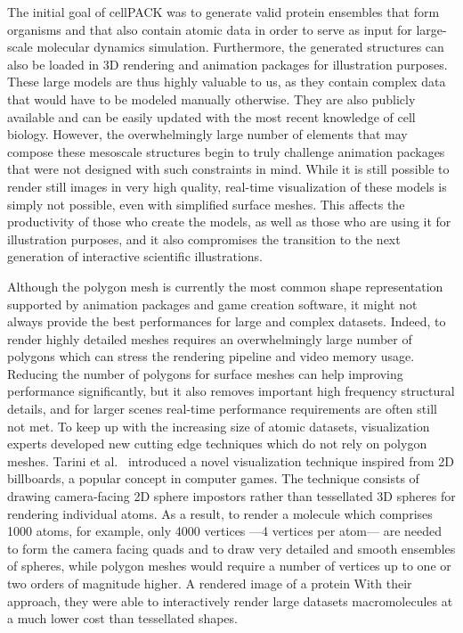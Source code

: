 The initial goal of cellPACK was to generate valid protein ensembles that form organisms and that also contain atomic data in order to serve as input for large-scale molecular dynamics simulation.
Furthermore, the generated structures can also be loaded in 3D rendering and animation packages for illustration purposes.
These large models are thus highly valuable to us, as they contain complex data that would have to be modeled manually otherwise.
They are also publicly available and can be easily updated with the most recent knowledge of cell biology.
However, the overwhelmingly large number of elements that may compose these mesoscale structures begin to truly challenge animation packages that were not designed with such constraints in mind.
While it is still possible to render still images in very high quality, real-time visualization of these models is simply not possible, even with simplified surface meshes. 
This affects the productivity of those who create the models, as well as those who are using it for illustration purposes, and it also compromises the transition to the next generation of interactive scientific illustrations.

Although the polygon mesh is currently the most common shape representation supported by animation packages and game creation software, it might not always provide the best performances for large and complex datasets.
Indeed, to render highly detailed meshes requires an overwhelmingly large number of polygons which can stress the rendering pipeline and video memory usage.
Reducing the number of polygons for surface meshes can help improving performance significantly, but it also removes important high frequency structural details, and for larger scenes real-time performance requirements are often still not met.
To keep up with the increasing size of atomic datasets, visualization experts developed new cutting edge techniques which do not rely on polygon meshes.
Tarini et al.~\cite{tarini2006ambient} introduced a novel visualization technique inspired from 2D billboards, a popular concept in computer games.
The technique consists of drawing camera-facing 2D sphere impostors rather than tessellated 3D spheres for rendering individual atoms.
As a result, to render a molecule which comprises 1000 atoms, for example, only 4000 vertices ---4 vertices per atom--- are needed to form the camera facing quads and to draw very detailed and smooth ensembles of spheres, while polygon meshes would require a number of vertices up to one or two orders of magnitude higher.
A rendered image of a protein 
With their approach, they were able to interactively render large datasets macromolecules at a much lower cost than tessellated shapes.



